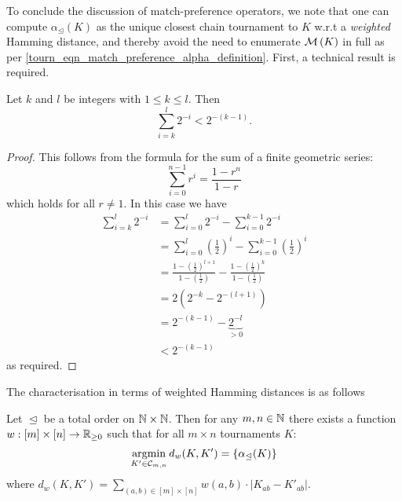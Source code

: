 
To conclude the discussion of match-preference operators, we note that one can
compute $\alpha_{\trianglelefteq}(K)$ as the unique closest chain tournament to
$K$ w.r.t a \emph{weighted} Hamming distance, and thereby avoid the need to
enumerate $\operatorname{\mathcal{M}}\left({K}\right)$ in full as per
\cref{tourn_eqn_match_preference_alpha_definition}. First, a technical result
is required.

\begin{lemma}
   \label{tourn_result_powertwo}

   Let $k$ and $l$ be integers with $1 \le k \le l$. Then
   \[ \sum_{i=k}^{l}{2^{-i}} < 2^{-(k - 1)}. \]

\end{lemma}

\begin{proof}

    This follows from the formula for the sum of a finite geometric
    series:
    \[
        \sum_{i=0}^{n-1}{r^i} = \frac{1-r^n}{1-r}
    \]
    which holds for all $r \ne 1$. In this case we have
    \begin{align*}
        \sum_{i=k}^{l}{2^{-i}}
        &= \sum_{i=0}^{l}{2^{-i}} - \sum_{i=0}^{k-1}{2^{-i}} \\
        &= \sum_{i=0}^{l}{\left(\frac{1}{2}\right)^i}
           -
           \sum_{i=0}^{k - 1}{\left(\frac{1}{2}\right)^i} \\
        &= \frac{
               1 - \left(\frac{1}{2}\right)^{l+1}
           }{
               1 - \left(\frac{1}{2}\right)
           }
           -
           \frac{
               1 - \left(\frac{1}{2}\right)^k
           }{
               1 - \left(\frac{1}{2}\right)
           } \\
        &= 2 \left(
           2^{-k} - 2^{-(l+1)}
        \right) \\
        &= 2^{-(k-1)} - \underbrace{2^{-l}}_{> 0} \\
        &< 2^{-(k-1)}
    \end{align*}
    as required.
\end{proof}

The characterisation in terms of weighted Hamming distances is as follows

\begin{theorem}
   \label{tourn_prop_matchpref_weightings}

    Let $\trianglelefteq$ be a total order on $\mathbb{N} \times \mathbb{N}$. Then for any $m,
    n \in \mathbb{N}$ there exists a function $w: [m] \times [n] \to \mathbb{R}_{\ge 0}$ such
    that for all $m \times n$ tournaments $K$:
    \begin{equation}
        \label{tourn_eqn_matchpref_argmin}
        \argmin_{K' \in \ch_{m,n}}{d_w(K, K')} = \{\alpha_{\trianglelefteq}(K)\}
    \end{equation}
    where $d_w(K, K') = \sum_{(a,b) \in [m] \times [n]}{w(a,b) \cdot |K_{ab} -
    K'_{ab}|}$.

\end{theorem}

